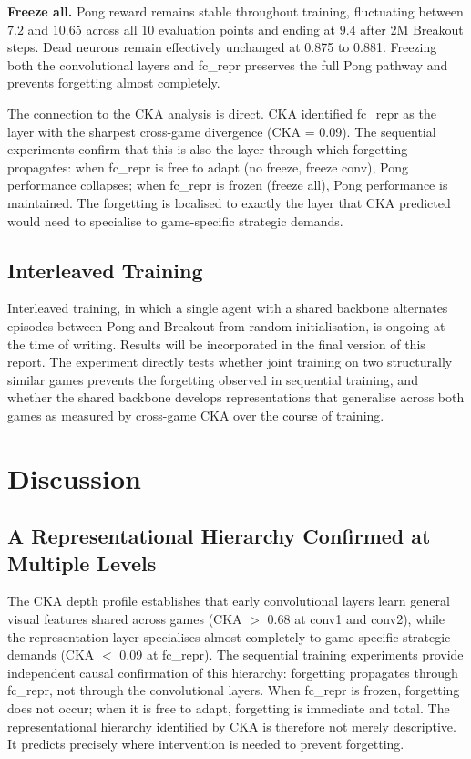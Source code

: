 \documentclass[a4paper]{article}
\begin{document}
\textbf{Freeze all.} Pong reward remains stable throughout training, fluctuating between $7.2$ and $10.65$ across all 10 evaluation points and ending at $9.4$ after 2M Breakout steps. Dead neurons remain effectively unchanged at 0.875 to 0.881. Freezing both the convolutional layers and fc\_repr preserves the full Pong pathway and prevents forgetting almost completely.

The connection to the CKA analysis is direct. CKA identified fc\_repr as the layer with the sharpest cross-game divergence (CKA = 0.09). The sequential experiments confirm that this is also the layer through which forgetting propagates: when fc\_repr is free to adapt (no freeze, freeze conv), Pong performance collapses; when fc\_repr is frozen (freeze all), Pong performance is maintained. The forgetting is localised to exactly the layer that CKA predicted would need to specialise to game-specific strategic demands.

\subsection{Interleaved Training}

Interleaved training, in which a single agent with a shared backbone alternates episodes between Pong and Breakout from random initialisation, is ongoing at the time of writing. Results will be incorporated in the final version of this report. The experiment directly tests whether joint training on two structurally similar games prevents the forgetting observed in sequential training, and whether the shared backbone develops representations that generalise across both games as measured by cross-game CKA over the course of training.

\section{Discussion}
\label{sec:discussion}

\subsection{A Representational Hierarchy Confirmed at Multiple Levels}

The CKA depth profile establishes that early convolutional layers learn general visual features shared across games (CKA $>$ 0.68 at conv1 and conv2), while the representation layer specialises almost completely to game-specific strategic demands (CKA $<$ 0.09 at fc\_repr). The sequential training experiments provide independent causal confirmation of this hierarchy: forgetting propagates through fc\_repr, not through the convolutional layers. When fc\_repr is frozen, forgetting does not occur; when it is free to adapt, forgetting is immediate and total. The representational hierarchy identified by CKA is therefore not merely descriptive. It predicts precisely where intervention is needed to prevent forgetting.
\end{document}
